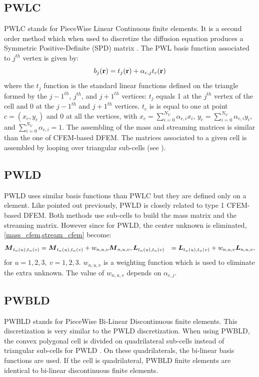 \subsection{PWLC}
PWLC stands for PieceWise Linear Continuous finite elements. It is a second
order method which when used to discretize the diffusion equation produces 
a Symmetric Positive-Definite (SPD) matrix \cite{Bailey2008}. The PWL basis 
function associated to $j^{th}$ vertex is given by:
\begin{equation}
  b_j(\mathbf{r}) = t_j(\mathbf{r}) + \alpha_{c,j} t_c(\mathbf{r})
\end{equation}
where the $t_j$ function is the standard linear functions defined on the
triangle formed by the $j-1^{th}$, $j^{th}$, and $j+1^{th}$ vertices:
$t_j$ equals 1 at the $j^{th}$ vertex of the cell and
0 at the $j-1^{th}$ and $j+1^{th}$ vertices. $t_c$ is
is equal to one at point $c=(x_c,y_c)$ and 0 at all the vertices, with $x_c =
\sum_{i=0}^{N_V} \alpha_{c,i} x_i$, $y_c = \sum_{i=0}^{N_V} \alpha_{c,i} y_i$,
and $\sum_{i=0}^{N_V} \alpha_{c,i} = 1$. The assembling of the mass and 
streaming matrices is similar than the one of CFEM-based DFEM. The matrices
associated to a given cell is assembled by looping over triangular sub-cells
(see ).
\subsection{PWLD} \label{subsec_pwld}
PWLD uses similar basis functions than PWLC but they are defined only on a
element. Like pointed out previously, PWLD is closely related to type 1
CFEM-based DFEM. Both methods use sub-cells to build the mass matrix and the
streaming matrix. However since for PWLD, the center unknown is eliminated,
\cref{mass_cfem,stream_cfem} become:
\begin{align}
  \boldsymbol{M}_{t_n(u),t_n(v)} &= \boldsymbol{M}_{t_n(u),t_n(v)} + w_{n,u,v}\boldsymbol{M}_{n,u,v}, 
  \boldsymbol{L}_{t_n(u),t_n(v)} &= \boldsymbol{L}_{t_n(u),t_n(v)} + w_{n,u,v} \boldsymbol{L}_{n,u,v}, 
\end{align}
for $u=1,2,3,\ v=1,2,3$. $w_{n,u,v}$ is a weighting function which is used to
eliminate the extra unknown. The value of $w_{n,u,v}$ depends on
$\alpha_{c,j}$.
\subsection{PWBLD}
PWBLD stands for PieceWise Bi-Linear Discontinuous finite elements. This 
discretization is very similar to the PWLD discretization. When using PWBLD, 
the convex polygonal cell is divided on quadrilateral sub-cells instead of
triangular sub-cells for PWLD \cite{Bailey2011}. On these quadrilaterals, 
the bi-linear basis functions are used. If the cell is 
quadrilateral, PWBLD finite elements are identical to bi-linear discontinuous 
finite elements.
